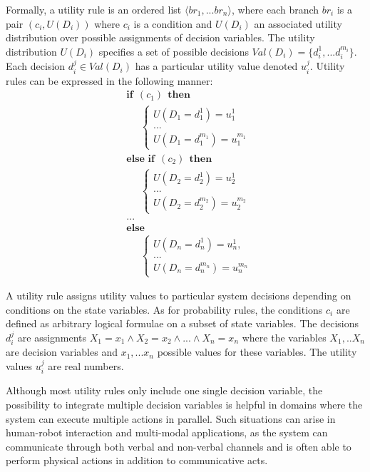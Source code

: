 Formally, a utility rule is an ordered list $\langle br_1, ... br_n\rangle$, where each branch $br_i$ is a pair $(c_i, U(D_i))$ where $c_i$ is a condition and $U(D_i)$ an associated utility distribution over possible assignments of decision variables. The utility distribution $U(D_i)$ specifies a set of possible decisions  $Val(D_i) = \{d_i^1,... d_i^{m_i}\}$.  Each decision $d_i^j \in Val(D_i)$ has a particular utility value denoted $u_i^j$.  Utility rules can be expressed in the following manner:
\begin{equation}
\begin{aligned}
& \textbf{if} \ \ (c_{1}) \ \ \textbf{then} \\ 
& \;\;\;\;\; \begin{cases}
U(D_1\!=\!d_1^1) = u_1^1 \\
 ... \\
U(D_1\!=\!d_1^{m_1}) = u_1^{m_1} 
\end{cases} \\[3mm]
& \textbf{else if} \ \ (c_{2}) \ \ \textbf{then} \\ 
& \;\;\;\;\; \begin{cases}
U(D_2\!=\!d_2^1) = u_2^1 \\
 ... \\
U(D_2\!=\!d_2^{m_2}) = u_2^{m_2} 
\end{cases} \\
& ...  \\
& \textbf{else} \\
& \;\;\;\;\; \begin{cases}
U(D_n\!=\!d_n^1) = u_n^1, \\
... \\
U(D_n\!=\!d_n^{m_n}) = u_n^{m_n}
\end{cases}
\end{aligned}
\end{equation}

A utility rule assigns utility values to particular system decisions depending on conditions on the state variables.  As for probability rules, the conditions $c_i$ are defined as arbitrary logical formulae on a subset of state variables.  The decisions $d_i^j$ are assignments $X_1\!=\!x_1 \land X_2\!=\!x_2 \land ... \land X_n\!=\!x_n$ where the variables $X_1,..X_n$ are decision variables and $x_1,...x_n$ possible values for these variables. The utility values $u_i^j$ are real numbers. 

Although most utility rules only include one single decision variable, the possibility to integrate multiple decision variables is helpful in domains where the system can execute multiple actions in parallel. Such situations can arise in human-robot interaction and multi-modal applications, as the system can communicate through both verbal and non-verbal channels and is often able to perform physical actions in addition to communicative acts. 
 
